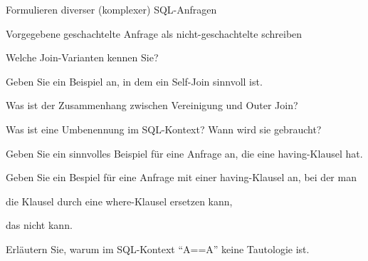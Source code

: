 \begin{fragen}
	\begin{enumeration}
		\item Formulieren diverser (komplexer) SQL-Anfragen
		\item Vorgegebene geschachtelte Anfrage als nicht-geschachtelte schreiben
		\item Welche Join-Varianten kennen Sie?
		\item Geben Sie ein Beispiel an, in dem ein Self-Join sinnvoll ist.
		\item Was ist der Zusammenhang zwischen Vereinigung und Outer Join?
		\item Was ist eine Umbenennung im SQL-Kontext? Wann wird sie gebraucht?
		\item Geben Sie ein sinnvolles Beispiel für eine Anfrage an, die eine having-Klausel hat.
		\item Geben Sie ein Bespiel für eine Anfrage mit einer having-Klausel an, bei der man
		\begin{enumeration}
			\item die Klausel durch eine where-Klausel ersetzen kann,
			\item das nicht kann.
		\end{enumeration}
		\item Erläutern Sie, warum im SQL-Kontext ``A==A'' keine Tautologie ist.
	\end{enumeration}
\end{fragen}